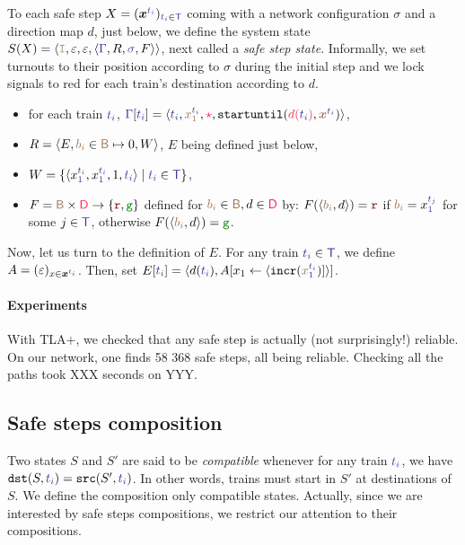 \documentclass[runningheads]{llncs}
\newcommand{\tuple}[1]{\ensuremath{\langle #1\rangle}}
\newcommand{\directions}{\dirFmt{\mathsf{D}}}
\newcommand{\dirFmt}[1]{{\color{dircolor} #1}}
\newcommand{\dirStop}{\ensuremath{\dirFmt{\star}}\xspace}
\newcommand{\posFmt}[1]{{\color{poscolor}{#1}}}
\newcommand{\blocks}{{\posFmt{\mathsf{B}}}}
\newcommand{\bid}[1]{\ensuremath{\posFmt{b_{#1}}}}
\newcommand{\swFmt}[1]{{\color{swcolor}{#1}}}
\newcommand{\switches}{\ensuremath{\swFmt{\sigma}}}
\newcommand{\trainFmt}[1]{{\color{traincolor} #1}}
\newcommand{\trainTuple}[4]{\langle \trainFmt{#1}, \posFmt{#2}, \dirFmt{#3}, #4 \rangle}
\newcommand{\trainSeq}{\ensuremath{\trainFmt{\Gamma}}\xspace}
\newcommand{\trains}{{\trainFmt{\mathsf{T}}}}
\newcommand{\tid}[1]{\ensuremath{\trainFmt{t_{#1}}}}
\newcommand{\su}[2]{{\mbox{$\mathtt{startuntil}(\dirFmt{#1}, \posFmt{#2})$}}\xspace}
\newcommand{\incr}[1]{{\mbox{\ensuremath{\mathtt{incr}(\posFmt{#1})}}}\xspace}
\newcommand{\regulator}{\ensuremath{R}}
\newcommand{\sigred}{{\mbox{${\color{red!50!black}\mathtt{r}}$}}\xspace}
\newcommand{\siggreen}{{\mbox{${\color{green!50!black}\mathtt{g}}$}}\xspace}
\newcommand{\signals}{\ensuremath{F}}
\newcommand{\stateTuple}[4]{\tuple{#1, #2, #3, #4}}
\newcommand{\guardFmt}[1]{{\color{guardcolor} \ensuremath{\mathtt{#1}}}}
\newcommand{\guardI}{\guardFmt{I}}
\newcommand{\bufferFmt}[1]{#1}
\newcommand{\emptyList}{\ensuremath{\varepsilon}}
\newcommand{\redTuple}[4]{\ensuremath{\tuple{#1, \bufferFmt{#2}, \bufferFmt{#3}, #4}}}
\begin{document}
To each safe step $X = (\vec{x}^{\tid{i}})_{\tid{i} \in \trains}$ coming with a network configuration $\sigma$ and a direction map $d$, just below, we define the system state $S(X) = \redTuple{\guardI}{ \emptyList}{ \emptyList}{\stateTuple{\trainSeq{}}{\regulator}{\switches}{\signals}}$, next called a \emph{safe step state}. Informally, we set turnouts to their position according to $\sigma$ during the initial step  and we lock signals to red for each train's destination according to $d$. 
\begin{itemize}
\item for each train $\tid{i}$, $\trainSeq[\tid{i}] = \trainTuple{\tid{i}}{x_1^{\tid{i}}}{\dirStop}{\su{d(\tid{i})}{\vec{x}^{\tid{i}}}}$,
\item $R = \langle E,  \bid{i} \in \blocks \mapsto 0, W\rangle$, $E$ being defined just below,
\item $W = \{ \tuple{x_1^\tid{i}, x_1^\tid{i}, 1, \tid{i}}  \mid \tid{i} \in \trains \}$, 
\item $F = \blocks \times \directions \to \{\sigred, \siggreen \}$ defined for $\bid{i} \in \blocks, d \in \directions$ by: $F(\langle \bid{i}, d\rangle) = \sigred$ if  $\bid{i} = x_1^\tid{j}$ for some $j\in \trains$, otherwise $F(\langle \bid{i}, d\rangle)  = \siggreen$. 
\end{itemize}

Now, let us turn to the definition of $E$. For any train $\tid{i} \in \trains$, we define $A= (\emptyList)_{x \in \vec{x}^\tid{i} }$. Then, set  $E[\tid{i}] = \langle d(\tid{i}), A[x_1 \leftarrow \langle \incr{x_1^\tid{i}}] \rangle]$. 

\paragraph{Experiments}  With TLA+, we checked that any safe step is actually (not surprisingly!) reliable.  On our network, one finds 58 368 safe steps, all being reliable. Checking all the paths took XXX seconds on YYY. %

\subsection{Safe steps composition}

Two states $S$ and $S'$ are said to be \emph{compatible} whenever  for any train $\tid{i}$, we have $\mathtt{dst}(S, \tid{i})  =  \mathtt{src}(S', \tid{i})$. In other words, trains must start in $S'$ at destinations of $S$. We define the composition only compatible states. Actually, since we are interested by safe steps compositions, we restrict our attention to their compositions.
  
\end{document}
